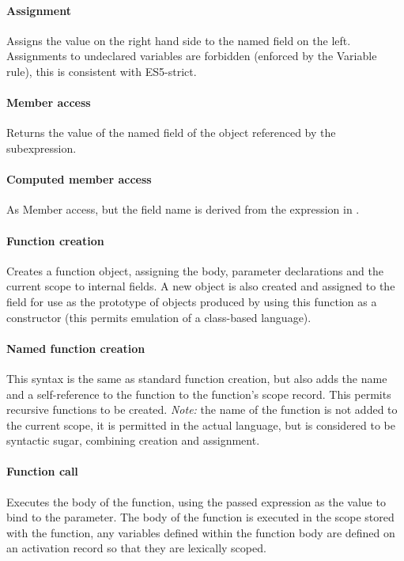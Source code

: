 \documentclass[a4paper]{article}
\begin{document}
\paragraph{Assignment} Assigns the value on the right hand side to the named
field on the left. Assignments to undeclared variables are forbidden (enforced
by the Variable rule), this is consistent with ES5-strict.

\paragraph{Member access} Returns the value of the named field of the object referenced by
the subexpression.

\paragraph{Computed member access} As Member access, but the field name is derived from
the expression in \js{[]}.

\paragraph{Function creation} Creates a function object, assigning the body, parameter
declarations and the current scope to internal fields. A new object is also
created and assigned to the  field for use as the prototype of
objects produced by using this function as a constructor (this permits
emulation of a class-based language).

\paragraph{Named function creation} This syntax is the same as standard function creation,
but also adds the name and a self-reference to the function to the function's
scope record. This permits recursive functions to be created. \emph{Note:} the
name of the function is not added to the current scope, it is permitted in the
actual language, but is considered to be syntactic sugar, combining creation and
assignment.

\paragraph{Function call} Executes the body of the function, using the passed expression
as the value to bind to the parameter. The body of the function is executed in
the scope stored with the function, any variables defined within the function
body are defined on an activation record so that they are lexically scoped.
\end{document}
